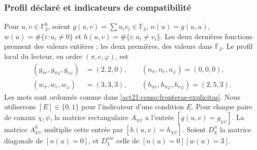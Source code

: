 \subsubsection{Profil déclaré et indicateurs de compatibilité}

Pour \(u,v\in\mathbb F_3^6\), soient
\(g(u,v)=\sum u_iv_i\in\mathbb F_3\),
\(n(u)=g(u,u)\), \(w(u)=\#\{i:u_i\ne0\}\) et
\(h(u,v)=\#\{i:u_i\ne v_i\}\). Les deux dernières fonctions prennent
des valeurs entières ; les deux premières, des valeurs dans \(\mathbb F_3\).
Le profil local du lecteur, en ordre \((\pi,e,\varphi)\), est
\begin{equation}
 \begin{split}
 (g_{\pi e},g_{\pi\varphi},g_{e\varphi})&=(2,2,0),\qquad
 (n_\pi,n_e,n_\varphi)=(0,0,0),\\
 (w_\pi,w_e,w_\varphi)&=(3,3,3),\qquad
 (h_{\pi e},h_{\pi\varphi},h_{e\varphi})=(2,5,3).
 \end{split}
 \label{act21:censo:perfil-local}
\end{equation}
Les mots sont ordonnés comme dans \eqref{act21:censo:fronteras-explicitas}.
Nous utiliserons \([E]\in\{0,1\}\) pour l'indicateur d'une condition \(E\).
Pour chaque paire de canaux \(\chi,\psi\), la matrice rectangulaire
\(A_{\chi\psi}\) a l'entrée \([g(u,v)=g_{\chi\psi}]\).
La matrice \(A^{h}_{\chi\psi}\) multiplie cette entrée par
\([h(u,v)=h_{\chi\psi}]\). Soient \(D_\chi^n\) la matrice diagonale
de \([n(u)=0]\), et \(D_\chi^{nw}\) celle de
\([n(u)=0][w(u)=3]\).


